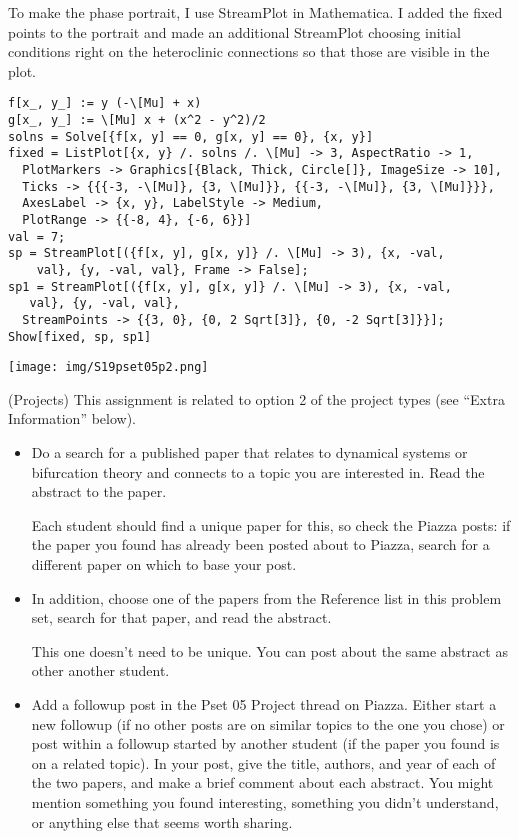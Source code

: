\documentclass[12pt,letterpaper]{exam}
\begin{document}
\begin{questions}
\begin{parts}
\begin{solution}
To make the phase portrait, I use StreamPlot in Mathematica.  I added the fixed points to the portrait and made an additional StreamPlot choosing initial conditions right on the heteroclinic connections so that those are visible in the plot.

\begin{verbatim}
f[x_, y_] := y (-\[Mu] + x)
g[x_, y_] := \[Mu] x + (x^2 - y^2)/2
solns = Solve[{f[x, y] == 0, g[x, y] == 0}, {x, y}]
fixed = ListPlot[{x, y} /. solns /. \[Mu] -> 3, AspectRatio -> 1, 
  PlotMarkers -> Graphics[{Black, Thick, Circle[]}, ImageSize -> 10], 
  Ticks -> {{{-3, -\[Mu]}, {3, \[Mu]}}, {{-3, -\[Mu]}, {3, \[Mu]}}}, 
  AxesLabel -> {x, y}, LabelStyle -> Medium, 
  PlotRange -> {{-8, 4}, {-6, 6}}]
val = 7;
sp = StreamPlot[({f[x, y], g[x, y]} /. \[Mu] -> 3), {x, -val, 
    val}, {y, -val, val}, Frame -> False];
sp1 = StreamPlot[({f[x, y], g[x, y]} /. \[Mu] -> 3), {x, -val, 
   val}, {y, -val, val}, 
  StreamPoints -> {{3, 0}, {0, 2 Sqrt[3]}, {0, -2 Sqrt[3]}}];
Show[fixed, sp, sp1]
\end{verbatim}

\texttt{[image: img/S19pset05p2.png]}

\end{solution}

\end{parts}

\question (Projects) This assignment is related to option 2 of the project types (see ``Extra Information'' below).
\begin{itemize}
    \item Do a search for a published paper that relates to dynamical systems or bifurcation theory and connects to a topic you are interested in.  Read the abstract to the paper.  
    
    Each student should find a unique paper for this, so check the Piazza posts: if the paper you found has already been posted about to Piazza, search for a different paper on which to base your post.
    \item In addition, choose one of the papers from the Reference list in this problem set, search for that paper, and read the abstract.
    
    This one doesn't need to be unique.  You can post about the same abstract as other another student.
    
    \item Add a followup post in the Pset 05 Project thread on Piazza.  Either start a new followup (if no other posts are on similar topics to the one you chose) or post within a followup started by another student (if the paper you found is on a related topic).  In your post, give the title, authors, and year of each of the two papers, and make a brief comment about each abstract.  You might mention something you found interesting, something you didn't understand, or anything else that seems worth sharing.
\end{itemize}  


\end{questions}
\end{document}

